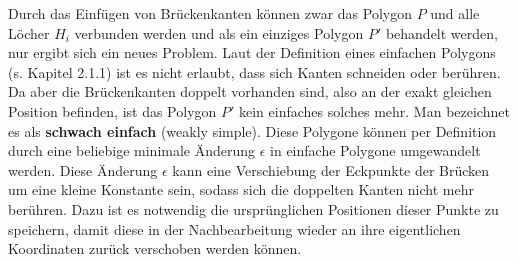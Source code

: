 Durch das Einfügen von Brückenkanten können zwar das Polygon $P$ und alle Löcher $H_i$ verbunden werden und als ein einziges Polygon $P'$ behandelt werden, nur ergibt sich ein neues Problem.
Laut der Definition eines einfachen Polygons (s. Kapitel 2.1.1) ist es nicht erlaubt, dass sich Kanten schneiden oder berühren. Da aber die Brückenkanten doppelt vorhanden sind, also an der exakt gleichen Position
befinden, ist das Polygon $P'$ kein einfaches solches mehr. Man bezeichnet es als \textbf{schwach einfach} (weakly simple)\cite{weaklysimple}. Diese Polygone können per Definition durch eine beliebige minimale Änderung $\epsilon$ in einfache Polygone 
umgewandelt werden. Diese Änderung $\epsilon$ kann eine Verschiebung der Eckpunkte der Brücken um eine kleine Konstante sein, sodass sich die doppelten Kanten nicht mehr berühren. Dazu ist es notwendig die ursprünglichen 
Positionen dieser Punkte zu speichern, damit diese in der Nachbearbeitung wieder an ihre eigentlichen Koordinaten zurück verschoben werden können.
